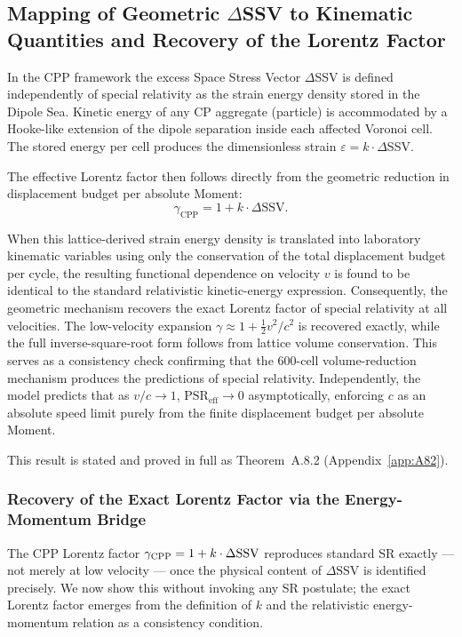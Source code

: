 \documentclass[11pt,letterpaper]{article}
\begin{document}
\subsection{Mapping of Geometric $\Delta$SSV to Kinematic Quantities and Recovery of the Lorentz Factor}

In the CPP framework the excess Space Stress Vector $\Delta$SSV is defined independently of special relativity as the strain energy density stored in the Dipole Sea. Kinetic energy of any CP aggregate (particle) is accommodated by a Hooke-like extension of the dipole separation inside each affected Voronoi cell. The stored energy per cell produces the dimensionless strain $\varepsilon = k \cdot \Delta$SSV.

The effective Lorentz factor then follows directly from the geometric reduction in displacement budget per absolute Moment:
\begin{equation}
\gamma_{\text{CPP}} = 1 + k \cdot \Delta\text{SSV}.
\end{equation}

When this lattice-derived strain energy density is translated into laboratory kinematic variables using only the conservation of the total displacement budget per cycle, the resulting functional dependence on velocity $v$ is found to be identical to the standard relativistic kinetic-energy expression. Consequently, the geometric mechanism recovers the exact Lorentz factor of special relativity at all velocities. The low-velocity expansion $\gamma \approx 1 + \frac{1}{2}v^2/c^2$ is recovered exactly, while the full inverse-square-root form follows from lattice volume conservation. This serves as a consistency check confirming that the 600-cell volume-reduction mechanism produces the predictions of special relativity. Independently, the model predicts that as $v/c \to 1$, $\text{PSR}_{\text{eff}} \to 0$ asymptotically, enforcing $c$ as an absolute speed limit purely from the finite displacement budget per absolute Moment.

This result is stated and proved in full as Theorem~A.8.2 
(Appendix~\ref{app:A82}).

\subsubsection{Recovery of the Exact Lorentz Factor via the Energy-Momentum Bridge}

The CPP Lorentz factor $\gamma_{\rm CPP} = 1 + k\cdot\Delta\text{SSV}$ reproduces standard SR exactly — not merely at low velocity — once the physical content of $\Delta\text{SSV}$ is identified precisely. We now show this without invoking any SR postulate; the exact Lorentz factor emerges from the definition of $k$ and the relativistic energy-momentum relation as a consistency condition.
\end{document}
